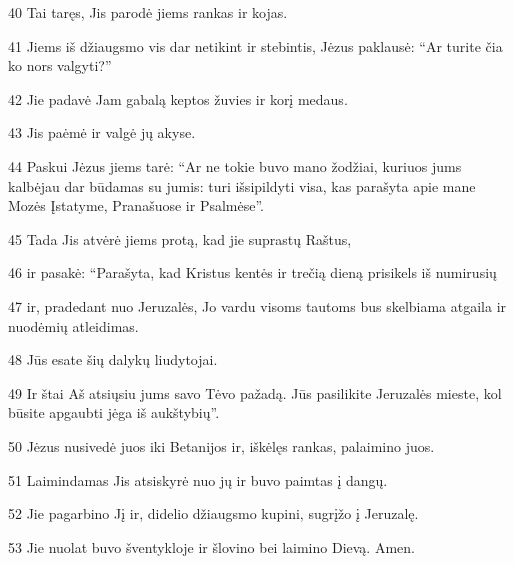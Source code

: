 \par 40 Tai taręs, Jis parodė jiems rankas ir kojas. 
\par 41 Jiems iš džiaugsmo vis dar netikint ir stebintis, Jėzus paklausė: “Ar turite čia ko nors valgyti?” 
\par 42 Jie padavė Jam gabalą keptos žuvies ir korį medaus. 
\par 43 Jis paėmė ir valgė jų akyse. 
\par 44 Paskui Jėzus jiems tarė: “Ar ne tokie buvo mano žodžiai, kuriuos jums kalbėjau dar būdamas su jumis: turi išsipildyti visa, kas parašyta apie mane Mozės Įstatyme, Pranašuose ir Psalmėse”. 
\par 45 Tada Jis atvėrė jiems protą, kad jie suprastų Raštus, 
\par 46 ir pasakė: “Parašyta, kad Kristus kentės ir trečią dieną prisikels iš numirusių 
\par 47 ir, pradedant nuo Jeruzalės, Jo vardu visoms tautoms bus skelbiama atgaila ir nuodėmių atleidimas. 
\par 48 Jūs esate šių dalykų liudytojai. 
\par 49 Ir štai Aš atsiųsiu jums savo Tėvo pažadą. Jūs pasilikite Jeruzalės mieste, kol būsite apgaubti jėga iš aukštybių”. 
\par 50 Jėzus nusivedė juos iki Betanijos ir, iškėlęs rankas, palaimino juos. 
\par 51 Laimindamas Jis atsiskyrė nuo jų ir buvo paimtas į dangų. 
\par 52 Jie pagarbino Jį ir, didelio džiaugsmo kupini, sugrįžo į Jeruzalę. 
\par 53 Jie nuolat buvo šventykloje ir šlovino bei laimino Dievą. Amen.



